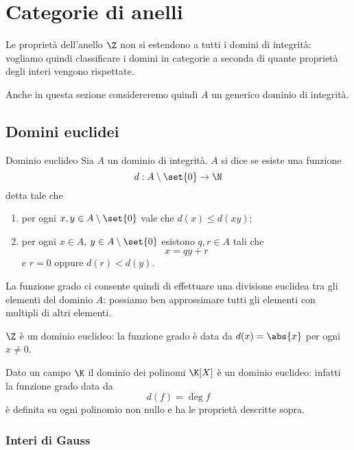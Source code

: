 \section{Categorie di anelli}

Le proprietà dell'anello $\Z$ non si estendono a tutti i domini di integrità: vogliamo quindi classificare i domini in categorie a seconda di quante proprietà degli interi vengono rispettate.

Anche in questa sezione considereremo quindi $A$ un generico dominio di integrità.

\subsection{Domini euclidei}

\begin{definition}
    {Dominio euclideo}{}
    Sia $A$ un dominio di integrità. $A$ si dice  se esiste una funzione \[
        d : A \setminus \set{0} \to \N    
    \] detta  tale che \begin{enumerate}[label={(\roman*)}]
        \item per ogni $x, y \in A \setminus \set{0}$ vale che $d(x) \leq d(xy)$;
        \item per ogni $x \in A$, $y \in A \setminus \set{0}$ esistono $q, r \in A$ tali che \[
            x = qy + r    
        \] e $r = 0$ oppure $d(r) < d(y)$.
    \end{enumerate}
\end{definition}

La funzione grado ci consente quindi di effettuare una divisione euclidea tra gli elementi del dominio $A$: possiamo ben approssimare tutti gli elementi con multipli di altri elementi.

\begin{example}
    $\Z$ è un dominio euclideo: la funzione grado è data da $d(x) = \abs{x}$ per ogni $x \neq 0$.
\end{example}
\begin{example}
    Dato un campo $\K$ il dominio dei polinomi $\K[X]$ è un dominio euclideo: infatti la funzione grado data da \[
        d(f) = \deg f    
    \] è definita su ogni polinomio non nullo e ha le proprietà descritte sopra.
\end{example}

\subsubsection{Interi di Gauss}

